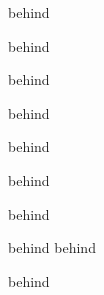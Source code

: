 % 

\newcommand{\abc}{ $ start {                    %
           test { abc -->  } } end  }   behind  %

\newcommand{\abc}[1]{ $ start {                 %
           test { abc --> #1 } } end  } behind  %

\newcommand{\abc}[1][default]{ $ start {        %
           test { abc --> #1 } } end  } behind  %

\newcommand*{\abc}{ $ start {                    %
           test { abc -->  } } end  }   behind  %

\newcommand*{\abc}[1]{ $ start {                 %
           test { abc --> #1 } } end  } behind  %

\newcommand*{\abc}[1][default]{ $ start {        %
           test { abc --> #1 } } end  } behind  %


\renewcommand{\abc}{ $ start {                    %
           test { abc -->  } } end  }   behind  %

\renewcommand{\abc}[1]{ $ start {                 %
           test { abc --> #1 } } end  } behind  %
\renewcommand{\abc}[1][default]{ $ start {        %
           test { abc --> #1 } } end  } behind  %


\renewcommand*{\abc}{ $ start {                    %
           test { abc -->  } } end  }   behind  %

